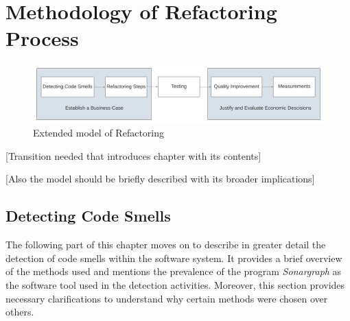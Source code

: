 \chapter{Methodology of Refactoring Process}



\bigskip %
\begin{figure}[htp]
    \centering
    \includegraphics[width=\textwidth]{./assets/extended_refactoring}
    \caption{Extended model of Refactoring}
\end{figure}
\bigskip %

[Transition needed that introduces chapter with its contents]


[Also the model should be briefly described with its broader implications]




\section{Detecting Code Smells}

The following part of this chapter moves on to describe in greater detail the detection of code smells within the software system. It provides a brief overview of the methods used and mentions the prevalence of the program \emph{Sonargraph} as the software tool used in the detection activities. Moreover, this section provides necessary clarifications to understand why certain methods were chosen over others.

